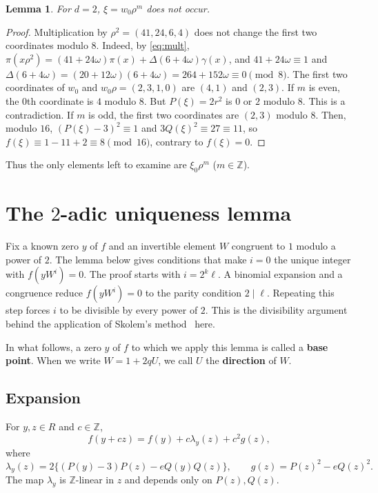 \documentclass[a4paper,11pt]{article}
\theoremstyle{plain}
\newtheorem{lemma}[theorem]{Lemma}
\theoremstyle{definition}
\theoremstyle{remark}
\numberwithin{equation}{section}
\numberwithin{table}{section}
\newcommand{\Z}{\mathbb{Z}}
\newcommand{\tsec}[2]{\texorpdfstring{#1}{#2}}
\begin{document}
\begin{lemma}\label{lem:extra}
For $d=2$, $\xi=w_0\rho^m$ does not occur.
\end{lemma}

\begin{proof}
Multiplication by $\rho^2=(41,24,6,4)$ does not change the first two coordinates modulo $8$.
Indeed, by \eqref{eq:mult}, $\pi(x\rho^2)=(41+24\omega)\pi(x)+\Delta(6+4\omega)\gamma(x)$, and $41+24\omega\equiv1$ and $\Delta(6+4\omega)=(20+12\omega)(6+4\omega)=264+152\omega\equiv0\pmod8$.
The first two coordinates of $w_0$ and $w_0\rho=(2,3,1,0)$ are $(4,1)$ and $(2,3)$.
If $m$ is even, the $0$th coordinate is $4$ modulo $8$. But $P(\xi)=2r^2$ is $0$ or $2$ modulo $8$. This is a contradiction.
If $m$ is odd, the first two coordinates are $(2,3)$ modulo $8$. Then, modulo $16$, $(P(\xi)-3)^2\equiv1$ and $3Q(\xi)^2\equiv27\equiv11$, so $f(\xi)\equiv1-11+2\equiv8\pmod{16}$, contrary to $f(\xi)=0$.
\end{proof}

Thus the only elements left to examine are $\xi_0\rho^m$ ($m\in\Z$).

\section{The \tsec{$2$}{2}-adic uniqueness lemma}\label{sec:dyadic}

Fix a known zero $y$ of $f$ and an invertible element $W$ congruent to $1$ modulo a power of $2$. The lemma below gives conditions that make $i=0$ the unique integer with $f(yW^i)=0$.
The proof starts with $i=2^k\ell$. A binomial expansion and a congruence reduce $f(yW^i)=0$ to the parity condition $2\mid\ell$. Repeating this step forces $i$ to be divisible by every power of $2$. This is the divisibility argument behind the application of Skolem's method~\cite{Skolem1935} here.

In what follows, a zero $y$ of $f$ to which we apply this lemma is called a \textbf{base point}.
When we write $W=1+2qU$, we call $U$ the \textbf{direction} of $W$.

\subsection{Expansion}

For $y,z\in R$ and $c\in\Z$,
\begin{equation}\label{eq:expand}
f(y+cz)=f(y)+c\lambda_y(z)+c^2g(z),
\end{equation}
where
\[
\lambda_y(z)=2\bigl\{(P(y)-3)P(z)-eQ(y)Q(z)\bigr\},\qquad g(z)=P(z)^2-eQ(z)^2.
\]
The map $\lambda_y$ is $\Z$-linear in $z$ and depends only on $P(z),Q(z)$.
\end{document}
